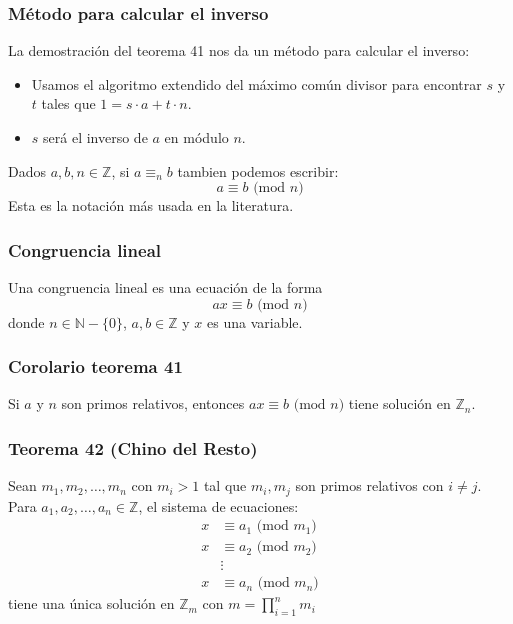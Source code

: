 \begin{multicols}{2}
    \subsubsection*{Método para calcular el inverso}
    La demostración del teorema 41 nos da un método para calcular el inverso:
    \begin{itemize}
        \item Usamos el algoritmo extendido del máximo común divisor para encontrar $s$ y $t$ tales que $1 = s \cdot a + t \cdot n$.
        \item $s$ será el inverso de $a$ en módulo $n$.
    \end{itemize}
    
    Dados $a,b,n \in \mathbb{Z}$, si $a \equiv_n b$ tambien podemos escribir:
    $$
    a \equiv b \text{ (mod } n)
    $$
    Esta es la notación más usada en la literatura.
    
    \subsubsection*{Congruencia lineal}
    Una congruencia lineal es una ecuación de la forma
    $$
    ax \equiv b \text{ (mod } n)
    $$
    donde $n \in \mathbb{N} - \{0\}$, $a,b \in \mathbb{Z}$ y $x$ es una variable.
    
    \subsubsection*{Corolario teorema 41}
    Si $a$ y $n$ son primos relativos, entonces $ax \equiv b \text{ (mod } n)$ tiene  solución en $\mathbb{Z}_n$.
    
    \subsubsection*{Teorema 42 (Chino del Resto)}
    Sean $m_1, m_2, \ldots, m_n$ con $m_i > 1$ tal que $m_i,m_j$ son primos relativos con $i \neq j$. Para $a_1, a_2, \ldots, a_n \in \mathbb{Z}$, el sistema de ecuaciones:
    \begin{align*}
        x &\equiv a_1 \text{ (mod } m_1) \\
        x &\equiv a_2 \text{ (mod } m_2) \\
        &\vdots \\
        x &\equiv a_n \text{ (mod } m_n)
    \end{align*}
    tiene una única solución en $\mathbb{Z}_m$ con $m = \displaystyle{\prod_{i=1}^n m_i}$
    

\end{multicols}
